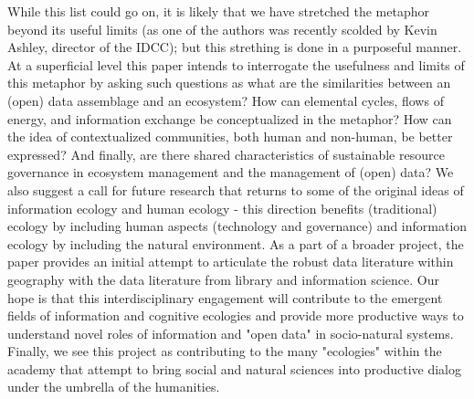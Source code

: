 While this list could go on, it is likely that we have stretched the metaphor beyond its useful limits (as one of the authors was recently scolded by Kevin Ashley, director of the IDCC); but this strething is done in a purposeful manner. At a superficial level this paper intends to interrogate the usefulness and limits of this metaphor by asking such questions as what are the similarities between an (open) data assemblage and an ecosystem? How can elemental cycles, flows of energy, and information exchange be conceptualized in the metaphor? How can the idea of contextualized communities, both human and non-human, be better expressed? And finally, are there shared characteristics of sustainable resource governance in ecosystem management and the management of (open) data? We also suggest a call for future research that returns to some of the original ideas of information ecology and human ecology - this direction benefits (traditional) ecology by including human aspects (technology and governance) and information ecology by including the natural environment. As a part of a broader project, the paper provides an initial attempt to articulate the robust data literature within geography with the data literature from library and information science. Our hope is that this interdisciplinary engagement will contribute to the emergent fields of information and cognitive ecologies and provide more productive ways to understand novel roles of information and "open data" in socio-natural systems. Finally, we see this project as contributing to the many "ecologies" within the academy that attempt to bring social and natural sciences into productive dialog under the umbrella of the humanities.

